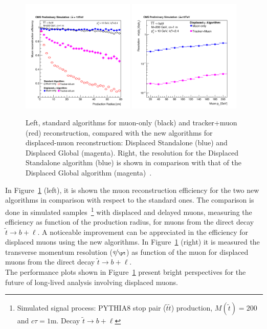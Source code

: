 \begin{figure}[h!]
\centering
  \includegraphics[clip,trim=0cm 0cm 0cm 2cm, width=0.48\textwidth]{Figures/c2/newreco.pdf}
  \includegraphics[clip,trim=0cm 0cm 0cm 2cm, width=0.48\textwidth]{Figures/c2/newreco2.pdf}
  \caption{Left, standard algorithms for muon-only (black) and tracker+muon (red) reconstruction,
compared with the new algorithms for displaced-muon reconstruction: Displaced
Standalone (blue) and Displaced Global
(magenta). Right, the resolution for the Displaced Standalone algorithm (blue) is shown in comparison
with that of the Displaced Global algorithm (magenta)~\cite{CMS-DP-2015-015}.}
  \label{fig:newreco}
\end{figure}

In Figure~\ref{fig:newreco} (left), it is shown the muon reconstruction
efficiency for the two new algorithms in comparison with respect to
the standard ones. The comparison is done in 
simulated samples~\footnote{Simulated signal process: PYTHIA8 stop 
  pair ($\tilde{t}\tilde{t}$) production, $M(\tilde{t}) = 200$\GeV and
$c\tau=1$m. Decay $\tilde{t} \rightarrow b + \ell$} with displaced and
delayed muons, measuring the efficiency as function of the production radius, for muons from
the direct decay $\tilde{t} \rightarrow b + \ell$. A noticeable
improvement can be appreciated in the efficiency for displaced muons
using the new algorithms. In Figure~\ref{fig:newreco} (right) it is
measured the transverse momentum resolution ($\nicefrac{q}{\pt}$) as
function of the muon \pt for displaced muons from the direct decay $\tilde{t} \rightarrow b + \ell$.\\
The performance plots shown in Figure~\ref{fig:newreco} present bright
perspectives for the future of long-lived analysis involving
displaced muons. 

